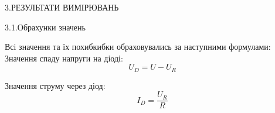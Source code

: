 \documentclass[a4paper,14pt]{extreport}
\begin{document}
\begin{center}
\begin{figure}[h]
\caption[wec]{ }
\label{ris:image}
\end{figure}
\end{center}








\clearpage
\newpage
\begin{center}3.РЕЗУЛЬТАТИ ВИМІРЮВАНЬ\\ \end{center}
\begin{center}3.1.Обрахунки значень\\ \end{center}
Всі значення та їх похибкибки обраховувались за наступними формулами:\\
Значення спаду напруги на діоді:
\begin{equation}
U_D = U-U_R
\end{equation}

Значення струму через діод:
\begin{equation}
I_D = \dfrac{U_R}R
\end{equation}
\end{document}
